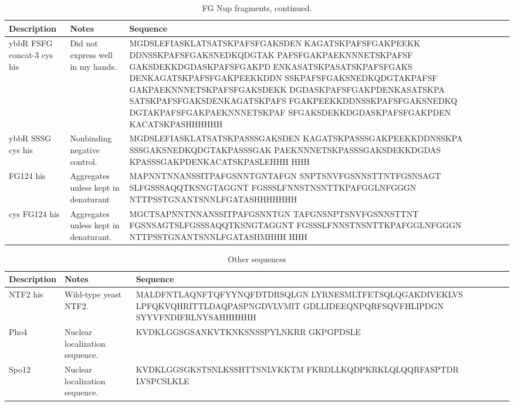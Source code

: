 \begin{table}[b!]
\centering
  \caption[FG Nup sequences, continued.]{FG Nup fragments, continued.}
    \label{table:FSFG}
    \begin{tabular}{p{3.5cm}p{4cm}p{8cm}}
      Description & Notes &Sequence \\
      \hline
	ybbR FSFG concat-3 cys his& Did not express well in my hands.& MGDSLEFIASKLATSATSKPAFSFGAKSDEN
KAGATSKPAFSFGAKPEEKK
DDNSSKPAFSFGAKSNEDKQDGTAK
PAFSFGAKPAEKNNNETSKPAFSF
GAKSDEKKDGDASKPAFSFGAKPD
ENKASATSKPASATSKPAFSFGAKS
DENKAGATSKPAFSFGAKPEEKKDDN
SSKPAFSFGAKSNEDKQDGTAKPAFSF
GAKPAEKNNNETSKPAFSFGAKSDEKK
DGDASKPAFSFGAKPDENKASATSKPA
SATSKPAFSFGAKSDENKAGATSKPAFS
FGAKPEEKKDDNSSKPAFSFGAKSNEDKQ
DGTAKPAFSFGAKPAEKNNNETSKPAF
SFGAKSDEKKDGDASKPAFSFGAKPDEN
KACATSKPASHHHHHH\\
\hline
ybbR SSSG cys his & Nonbinding negative control. & MGDSLEFIASKLATSATSKPASSSGAKSDEN
KAGATSKPASSSGAKPEEKKDDNSSKPA
SSSGAKSNEDKQDGTAKPASSSGAK
PAEKNNNETSKPASSSGAKSDEKKDGDAS
KPASSSGAKPDENKACATSKPASLEHHH
HHH\\
	\hline

	FG124 his& Aggregates unless kept in denaturant & MAPNNTNNANSSITPAFGSNNTGNTAFGN
SNPTSNVFGSNNSTTNTFGSNSAGT
SLFGSSSAQQTKSNGTAGGNT
FGSSSLFNNSTNSNTTKPAFGGLNFGGGN
NTTPSSTGNANTSNNLFGATASHHHHHHH\\
\hline
	cys FG124 his& Aggregates unless kept in denaturant. & MGCTSAPNNTNNANSSITPAFGSNNTGN
TAFGNSNPTSNVFGSNNSTTNT
FGSNSAGTSLFGSSSAQQTKSNGTAGGNT
FGSSSLFNNSTNSNTTKPAFGGLNFGGGN
NTTPSSTGNANTSNNLFGATASHMHHH
HHH\\
\hline
    \end{tabular}
\end{table}
\newpage
\begin{table}[b!]
\centering
  \caption[Other sequences.]{Other sequences}
    \label{table:sequences}
    \begin{tabular}{p{3.5cm}p{4cm}p{8cm}}
      Description & Notes &Sequence \\


\hline
	
NTF2 his & Wild-type yeast NTF2. & MALDFNTLAQNFTQFYYNQFDTDRSQLGN
LYRNESMLTFETSQLQGAKDIVEKLVS
LPFQKVQHRITTLDAQPASPNGDVLVMIT
GDLLIDEEQNPQRFSQVFHLIPDGN
SYYVFNDIFRLNYSAHHHHHH\\
	\hline
Pho4 & Nuclear localization sequence. & KVDKLGGSGSANKVTKNKSNSSPYLNKRR
GKPGPDSLE \\
\hline
Spo12 & Nuclear localization sequence. & KVDKLGGSGKSTSNLKSSHTTSNLVKKTM
FKRDLLKQDPKRKLQLQQRFASPTDR
LVSPCSLKLE
 \\

\hline
    \end{tabular}
\end{table}